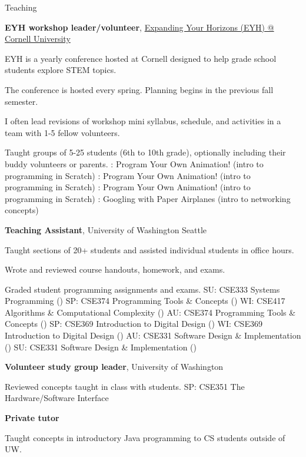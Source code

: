 \begin{rubric}{Teaching}

    \textbf{EYH workshop leader/volunteer}, \href{https://www.eyh.cornell.edu/}{Expanding Your Horizons (EYH) @ Cornell University}
    \par EYH is a yearly conference hosted at Cornell designed to help grade school students explore STEM topics.
    \par The conference is hosted every spring. Planning begins in the previous fall semester.
    \par I often lead revisions of workshop mini syllabus, schedule, and activities in a team with 1-5 fellow volunteers.
    \par Taught groups of 5-25 students (6th to 10th grade), optionally including their buddy volunteers or parents.
: Program Your Own Animation! (intro to programming in Scratch)
: Program Your Own Animation! (intro to programming in Scratch)
: Program Your Own Animation! (intro to programming in Scratch)
: Googling with Paper Airplanes (intro to networking concepts)

\entry*[2018 -- 2021] %
	\textbf{Teaching Assistant}, University of Washington Seattle
	\par Taught sections of 20+ students and assisted individual students in office hours.
	\par Wrote and reviewed course handouts, homework, and exams.
	\par Graded student programming assignments and exams.
 SU: CSE333 Systems Programming (\pWangC{})
 SP: CSE374 Programming Tools \& Concepts (\pHazenM{})
 WI: CSE417 Algorithms \& Computational Complexity (\pWeberR{})
 AU: CSE374 Programming Tools \& Concepts (\pPirtleT{})
 SP: CSE369 Introduction to Digital Design (\pHsiaJ{})
 WI: CSE369 Introduction to Digital Design (\pHsiaJ{})
 AU: CSE331 Software Design \& Implementation (\pErnstM{})
 SU: CSE331 Software Design \& Implementation (\pPerlmutterL{})

\entry*[2018]
	\textbf{Volunteer study group leader}, University of Washington
	\par Reviewed concepts taught in class with students.
 SP: CSE351 The Hardware/Software Interface

\entry*[2017]
	\textbf{Private tutor}
	\par Taught concepts in introductory Java programming to CS students outside of UW.
\end{rubric}